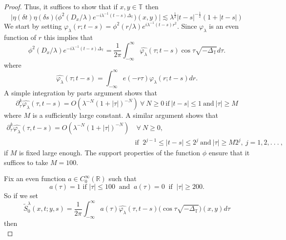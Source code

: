 \documentclass[11pt]{amsart}
\numberwithin{equation}{section}
\newcommand{\la}{\lambda}
\newcommand{\T}[1][]{\mathbb{T}^#1}
\newcommand{\laplac}[1]{\Delta_{#1}}
\begin{document}
\begin{proof}
Thus, it suffices to show that if $x,y \in \T{}$ then 
\begin{equation}
    \big|\eta(\delta t) \eta(\delta s)\big(\phi^2(D_{x} / \la)e^{-i\la^{-1}(t-s)\laplac{\T{}}}\big)(x,y)\big| \lesssim \la^{\frac{1}{2}}|t-s|^{-\frac{1}{2}}(1 + |t-s|)
\end{equation}
We start by setting $\varphi_\la(r; t-s) = \phi^2(r/\la) e^{i\la^{-1}(t-s)r^2}$. Since $\varphi_{\la}$ is an even function of $r$ this implies that 
\begin{equation}
    \phi^2(D_x/\la)e^{-i\la^{-1}(t-s)\laplac{\T{}}} = \frac{1}{2\pi}\int_{-\infty}^{\infty}\widehat{\varphi_{\la}}(\tau; t-s)\cos{\tau\sqrt{-\laplac{\T{}}}}d\tau.
\end{equation}
where 
\begin{equation}
    \widehat{\varphi_{\la}}(\tau; t-s) = \int_{-\infty}^{\infty} e(-r\tau)\varphi_{\la}(r;t-s)dr.
\end{equation}
A simple integration by parts argument shows that 
\begin{equation}
    \partial^{k}_{\tau} \widehat{\varphi_{\la}}(\tau, t-s) = O(\la^{-N}(1 + |\tau|)^{-N}) \ \forall \ N \geq 0 \ \text{if} \ |t-s| \leq 1 \ \text{and} \ |\tau| \geq M
\end{equation}
where $M$ is a sufficiently large constant. A similar argument shows that 
\begin{equation}
\begin{split}
    \partial^{k}_{\tau} \widehat{\varphi_{\la}}(\tau, t-s) = O(\la^{-N}(1 + |\tau|)^{-N}) &\ \forall \ N \geq 0, \\
    &\text{if } \ 2^{j-1} \leq |t-s| \leq 2^j \ \text{and} \ |\tau| \geq M2^j,\ j = 1,2,. \ . \ . \ ,
\end{split}
\end{equation}
if $M$ is fixed large enough. The support properties of the function $\phi$ ensure that it suffices to take $M = 100$. \par
Fix an even function $a \in C_{0}^{\infty}(\mathbb{R})$ such that
\begin{equation}
    a(\tau) = 1 \text{ if } |\tau| \leq 100 \ \text{ and } \ a(\tau) = 0 \ \text{ if } \ |\tau| \geq 200.
\end{equation}
So if we set
\begin{equation}
    \tilde{S}^{\la}_{0}(x,t;y,s) = \frac{1}{2\pi}\int_{-\infty}^{\infty}a(\tau) \widehat{\varphi_{\la}}(\tau, t-s)\big(\cos\tau\sqrt{-\laplac{\T{}}}\big)(x,y)d\tau
\end{equation}
then
\begin{equation}

\end{equation}
\end{proof}
\end{document}
